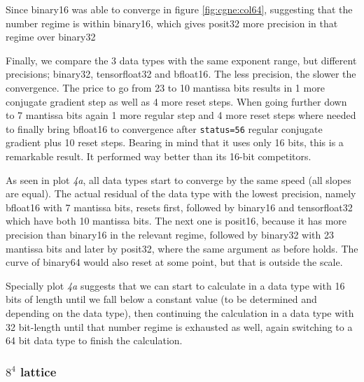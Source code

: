 \documentclass{article}
\theoremstyle{plain} %
\theoremstyle{convention} %
\theoremstyle{remark} %
\def\code#1{\texttt{#1}}
\numberwithin{equation}{section}
\begin{document}
Since \gls{binary16} was able to converge in figure \ref{fig:cgne:col64}, suggesting that the number regime is within \gls{binary16}, which gives \gls{posit32} more precision in that regime over \gls{binary32}

Finally, we compare the \num{3} data types with the same exponent range, but different precisions; \gls{binary32}, \gls{tensorfloat32} and \gls{bfloat16}. The less precision, the slower the convergence. The price to go from \num{23} to \num{10} mantissa bits results in \num{1} more conjugate gradient step as well as \num{4} more reset steps. When going further down to \num{7} mantissa bits again \num{1} more regular step and \num{4} more reset steps where needed to finally bring \gls{bfloat16} to convergence after \code{status=56} regular conjugate gradient plus \num{10} reset steps. Bearing in mind that it uses only \num{16} bits, this is a remarkable result. It performed way better than its \num{16}-bit competitors.

As seen in plot \textit{4a}, all data types start to converge by the same speed (all slopes are equal). The actual residual of the data type with the lowest precision, namely \gls{bfloat16} with \num{7} mantissa bits, resets first, followed by \gls{binary16} and \gls{tensorfloat32} which have both \num{10} mantissa bits. The next one is \gls{posit16}, because it has more precision than \gls{binary16} in the relevant regime, followed by \gls{binary32} with \num{23} mantissa bits and later by \gls{posit32}, where the same argument as before holds. The curve of \gls{binary64} would also reset at some point, but that is outside the scale.

Specially plot \textit{4a} suggests that we can start to calculate in a data type with \num{16} bits of length until we fall below a constant value (to be determined and depending on the data type), then continuing the calculation in a data type with \num{32} bit-length until that number regime is exhausted as well, again switching to a \num{64} bit data type to finish the calculation.

\subsubsection{$8^4$ lattice}
\end{document}
